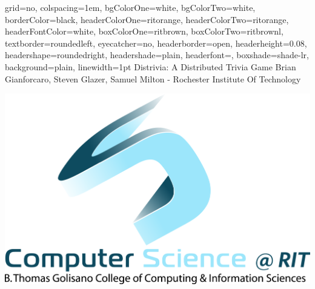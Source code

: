 \documentclass[landscape,a0paper,final,showframe]{baposter}
\begin{document}
\begin{poster}{
  grid=no,
  colspacing=1em,
  bgColorOne=white,
  bgColorTwo=white,
  borderColor=black,
  headerColorOne=ritorange,
  headerColorTwo=ritorange,
  headerFontColor=white,
  boxColorOne=ritbrown,
  boxColorTwo=ritbrownl,
  textborder=roundedleft,
  eyecatcher=no,
  headerborder=open,
  headerheight=0.08\textheight,
  headershape=roundedright,
  headershade=plain,
  headerfont=\Large\textsf, %
  boxshade=shade-lr,
  background=plain,
  linewidth=1pt
  }
  {} %
  {\sf %
  Distrivia: A Distributed Trivia Game}
  {\sf %
  \newline
  Brian Gianforcaro, Steven Glazer, Samuel Milton
  - Rochester Institute Of Technology
  }
  {{\begin{minipage}{18em}
    \hfill
    \includegraphics[scale=0.05]{logo}
  \end{minipage}}
  }


     \newlength{\leftimgwidth}
     \setlength{\leftimgwidth}{0.78em+8.0em}


\end{poster}
\end{document}
